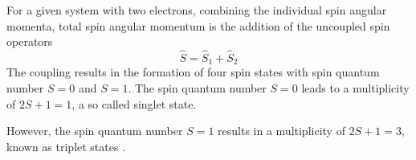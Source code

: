 For a given system with two electrons, combining the individual spin angular momenta, total spin angular momentum 
is the addition of the uncoupled spin operators
\begin{equation}
    \hat{S} = \hat{S}_1 + \hat{S}_2 
    \label{eq:}
\end{equation}
The coupling results in the formation of four spin states with spin quantum number
$S = 0$ and $S = 1$. 
The spin quantum number $S = 0$ leads to a multiplicity of $2S + 1 = 1$, a so called singlet state. 

However, the spin quantum number $S = 1$ results in a multiplicity of
$2S + 1 = 3$, known as triplet states \cite{Piela2014}.  



